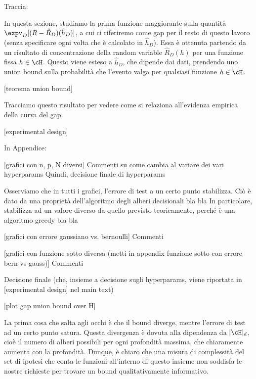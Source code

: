 Traccia: 

In questa sezione, studiamo la prima funzione maggiorante sulla quantità $\expv_D[(R-\hat R_D)(\hat h_D)]$, a cui ci riferiremo come gap per il resto di questo lavoro (senza specificare ogni volta che è calcolato in $\hat h_D$). 
Essa è ottenuta partendo da un risultato di concentrazione della random variable $\hat R_D(h)$ per una funzione fissa $h\in\cH$. Questo viene esteso a $\hat h_D$, che dipende dai dati, prendendo uno union bound sulla probabilità che l'evento valga per qualsiasi funzione $h\in\cH$.

[teorema union bound]

Tracciamo questo risultato per vedere come si relaziona all'evidenza empirica della curva del gap. 

[experimental design]

In Appendice:

[grafici con n, p, N diversi]
Commenti su come cambia al variare dei vari hyperparams
Quindi, decisione finale di hyperparams

Osserviamo che in tutti i grafici, l'errore di test a un certo punto stabilizza. Ciò è dato da una proprietà dell'algoritmo degli alberi decisionali bla bla
In particolare, stabilizza ad un valore diverso da quello previsto teoricamente, perché è una algoritmo greedy bla bla

[grafici con errore gaussiano vs. bernoulli]
Commenti 

[grafici con funzione sotto diversa (metti in appendix funzione sotto con errore bern vs gauss)]
Commenti

Decisione finale (che, insieme a decisione sugli hyperparams, viene riportata in [experimental design] nel main text)

[plot gap union bound over H]

La prima cosa che salta agli occhi è che il bound diverge, mentre l'errore di test ad un certo punto satura. Questa divergenza è dovuta alla dipendenza da $\vert \cH\vert_d$, cioè il numero di alberi possibili per ogni profondità massima, che chiaramente aumenta con la profondità. Dunque, è chiaro che una misura di complessità del set di ipotesi che conta le funzioni all'interno di questo insieme non soddisfa le nostre richieste per trovare un bound qualitativamente informativo. 

